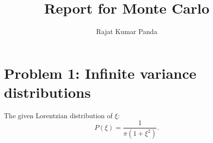 \documentclass[a4paper,10pt]{article}
\title{Report for Monte Carlo}
\author{Rajat Kumar Panda}
\begin{document}
\maketitle

\section*{Problem 1: Infinite variance distributions}

The given Lorentzian distribution of $\xi$:
\begin{equation}
P(\xi) = \frac{1}{\pi (1+\xi^2)}.
\end{equation}
\end{document}
